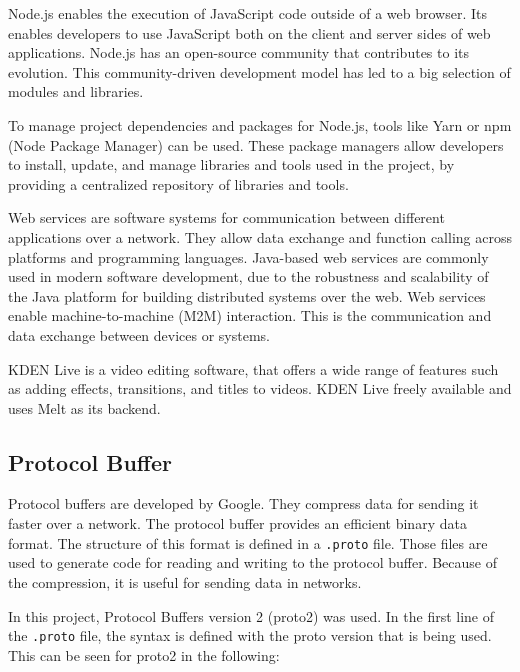 \documentclass[../MasterThesis.tex]{subfiles}
\begin{document}
Node.js enables the execution of JavaScript code outside of a web browser.
Its enables developers to use JavaScript both on the client and server sides of web applications. 
Node.js has an open-source community that contributes to its evolution. This community-driven development model has led to a big selection of modules and libraries.~\cite{nodejs, RM_Frontend, ap3_docs}


To manage project dependencies and packages for Node.js, tools like Yarn or npm (Node Package Manager) can be used. These package managers allow developers to install, update, and manage libraries and tools used in the project, by providing a centralized repository of libraries and tools.~\cite{RM_Frontend, npmyarn}



Web services are software systems for communication between different applications over a network. 
They allow data exchange and function calling across platforms and programming languages. 
Java-based web services are commonly used in modern software development, due to the robustness and scalability of the Java platform for building distributed systems over the web.
Web services enable machine-to-machine (M2M) interaction. This is the communication and data exchange between devices or systems.~\cite{webservice}

KDEN Live is a video editing software, that offers a wide range of features such as adding effects, transitions, and titles to videos. KDEN Live freely available and uses Melt as its backend.~\cite{kdenlive}



\subsection{Protocol Buffer}
\label{subsection:protocolbuffer}


Protocol buffers are developed by Google. They compress data for sending it faster over a network. The protocol buffer provides an efficient binary data format. The structure of this format is defined in a \texttt{.proto} file. Those files are used to generate code for reading and writing to the protocol buffer. Because of the compression, it is useful for sending data in networks.~\cite{protobuffer}

In this project, Protocol Buffers version 2 (proto2) was used. In the first line of the \texttt{.proto} file, the syntax is defined with the proto version that is being used. This can be seen for proto2 in the following:
\end{document}
